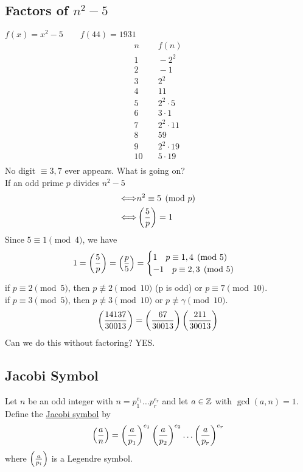     \subsection{Factors of $n^2 - 5$}
    $f(x) = x^2 - 5\quad\quad f(44) = 1931$
    \begin{align*}
        n &\quad f(n) \\
        1 &\quad -2^2 \\
        2 &\quad -1 \\
        3 &\quad 2^2 \\
        4 &\quad 11 \\
        5 &\quad 2^2\cdot 5 \\
        6 &\quad 3\cdot 1 \\
        7 &\quad 2^2\cdot 11 \\
        8 &\quad 59 \\
        9 &\quad 2^2\cdot 19 \\
        10 &\quad 5\cdot 19 \\
    \end{align*}
    No digit $\equiv 3,7$ ever appears. 
    What is going on? \\

    If an odd prime $p$ divides $n^2 - 5$
    \begin{align*}
        \Longleftrightarrow & n^2\equiv 5\pmod{p} \\
        \Longleftrightarrow & \left( \frac{5}{p} \right)  = 1
    \end{align*}
    Since $5\equiv 1\pmod{4}$, we have
    \[
        1=\left( \frac{5}{p} \right)  = \left( \frac{p}{5} \right)  = 
        \begin{cases}
            1 \quad p\equiv 1,4\pmod{5} \\
            -1 \quad p\equiv 2,3\pmod{5}
        \end{cases}
    \]
    if $p\equiv 2\pmod{5}$, then $p\not\equiv 2\pmod{10}$ (p is odd) or $p\equiv 7\pmod{10}$. \\
    if $p\equiv 3\pmod{5}$, then $p\not\equiv 3\pmod{10}$ or $p\not\equiv\gamma\pmod{10}$. \\
    
    \[
        \left( \frac{14137}{30013} \right)  = \left( \frac{67}{30013} \right) \left( \frac{211}{30013} \right) 
    \]
    Can we do this without factoring? YES. \\

    \subsection{Jacobi Symbol}
    \begin{definition}
        Let $n$ be an odd integer with $n = p_1^{e_1}\dots p_r^{e_r}$ 
        and let $a\in\mathbb{Z}$ with $\gcd(a,n) = 1$. Define the \underline{Jacobi symbol} by
        \[
            \left( \frac{a}{n} \right)  = \left( \frac{a}{p_1} \right) ^{e_1}\left( \frac{a}{p_2} \right) ^{e_2}\dots \left( \frac{a}{p_r} \right) ^{e_r}
        \]
        where $\left( \frac{a}{p_i} \right) $ is a Legendre symbol. \\       
    \end{definition}


